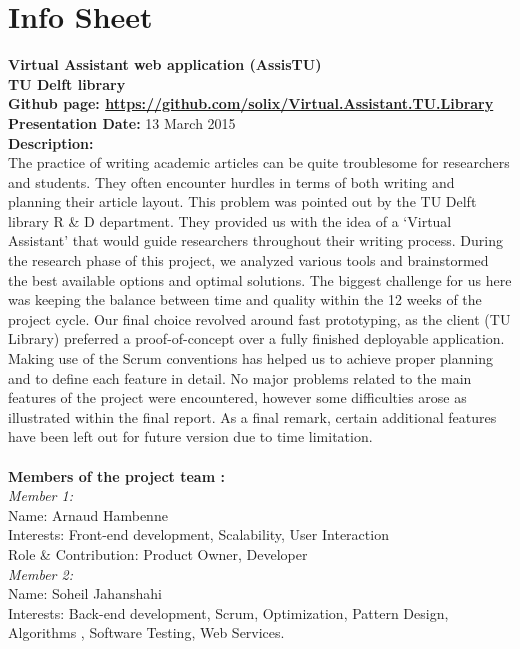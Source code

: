 \chapter{Info Sheet}    
\textbf{Virtual Assistant web application (AssisTU)\\}
\textbf{\small{TU Delft library\\}}
\textbf{Github page: \url{https://github.com/solix/Virtual.Assistant.TU.Library}\\}
\textbf{Presentation Date: } 13 March 2015\\ 
\bigskip
\textbf{Description: \\}
 The practice of writing academic articles can be quite troublesome for researchers and students. They often encounter hurdles in terms of both writing 
 and planning their article layout. This problem was pointed out by the TU Delft library R \& D department. They provided us with the idea of a 
 `Virtual Assistant' that would guide researchers throughout their writing process. During the research phase of this project, we analyzed various tools and brainstormed the best available options 
 and optimal solutions. The biggest challenge for us here was keeping the balance between time and quality within the 12 weeks of the project cycle. 
 Our final choice revolved around fast prototyping, as the client (TU Library) preferred a proof-of-concept over a fully finished deployable application. 
 Making use of the Scrum conventions has helped us to achieve proper planning and to define each feature in detail. No major problems related to the 
 main features of the project were encountered, however some difficulties arose as illustrated within the final report. As a final remark, certain 
 additional features have been left out for future version due to time limitation.\\\\
 \textbf{Members of the project team :\\}
 \textit{Member 1: \\}
	Name: Arnaud Hambenne\\
	Interests: Front-end development, Scalability, User Interaction\\ 
	Role \& Contribution: Product Owner, Developer\\
   \textit{Member 2: \\}
   Name: Soheil Jahanshahi\\
   Interests: Back-end development, Scrum, Optimization, Pattern Design, Algorithms , Software Testing, Web Services.\\ 
